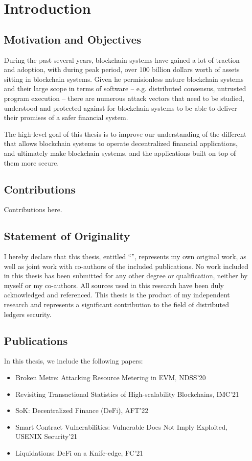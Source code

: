 \chapter{Introduction}

\section{Motivation and Objectives}
During the past several years, blockchain systems have gained a lot of traction and adoption, with during peak period, over 100 billion dollars worth of assets sitting in blockchain systems.
Given he permisionless nature blockchain systems and their large scope in terms of software -- e.g. distributed consensus, untrusted program execution -- there are numerous attack vectors that need to be studied, understood and protected against for blockchain systems to be able to deliver their promises of a safer financial system.

The high-level goal of this thesis is to improve our understanding of the different that allows blockchain systems to operate decentralized financial applications, and ultimately make blockchain systems, and the applications built on top of them more secure.



\section{Contributions}

Contributions here.


\section{Statement of Originality}
I hereby declare that this thesis, entitled ``\thesistitle'', represents my own original work, as well as joint work with co-authors of the included publications.
No work included in this thesis has been submitted for any other degree or qualification, neither by myself or my co-authors.
All sources used in this research have been duly acknowledged and referenced.
This thesis is the product of my independent research and represents a significant contribution to the field of distributed ledgers security.

\section{Publications}

In this thesis, we include the following papers:

\begin{itemize}
\item Broken Metre: Attacking Resource Metering in EVM, NDSS'20 \cite{dblp:conf/ndss/0002l20} %
\item Revisiting Transactional Statistics of High-scalability Blockchains, IMC'21
\item SoK: Decentralized Finance (DeFi), AFT'22
\item Smart Contract Vulnerabilities: Vulnerable Does Not Imply Exploited, USENIX Security'21
\item Liquidations: DeFi on a Knife-edge, FC'21
\end{itemize}
